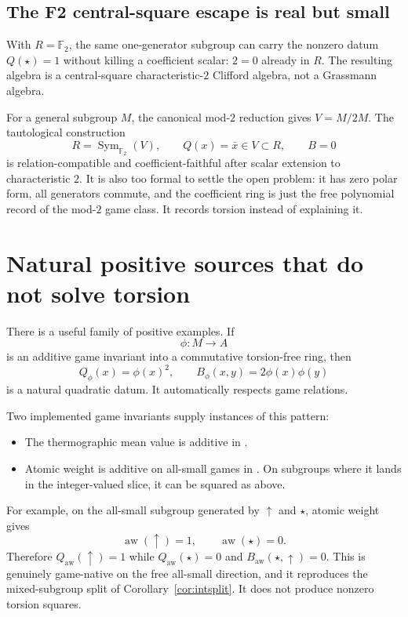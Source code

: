\documentclass[11pt]{article}
\theoremstyle{remark}
\newcommand{\F}{\mathbb{F}}
\newcommand{\Sym}{\operatorname{Sym}}
\newcommand{\aw}{\operatorname{aw}}
\begin{document}
\subsection{The F2 central-square escape is real but small}

With $R=\F_2$, the same one-generator subgroup can carry the nonzero datum
$Q(\star)=1$ without killing a coefficient scalar: $2=0$ already in $R$.
The resulting algebra is a central-square characteristic-$2$ Clifford algebra,
not a Grassmann algebra.

For a general subgroup $M$, the canonical mod-$2$ reduction gives
$V=M/2M$.  The tautological construction
\[
  R=\Sym_{\F_2}(V),\qquad Q(x)=\bar{x}\in V\subset R,\qquad B=0
\]
is relation-compatible and coefficient-faithful after scalar extension to
characteristic $2$.  It is also too formal to settle the open problem: it has
zero polar form, all generators commute, and the coefficient ring is just the
free polynomial record of the mod-$2$ game class.  It records torsion instead
of explaining it.

\section{Natural positive sources that do not solve torsion}

There is a useful family of positive examples.  If
\[
  \phi\colon M\to A
\]
is an additive game invariant into a commutative torsion-free ring, then
\[
  Q_\phi(x)=\phi(x)^2,\qquad
  B_\phi(x,y)=2\phi(x)\phi(y)
\]
is a natural quadratic datum.  It automatically respects game relations.

Two implemented game invariants supply instances of this pattern:

\begin{itemize}[leftmargin=2em]
\item The thermographic mean value is additive in
  .
\item Atomic weight is additive on all-small games in
  .  On subgroups where it lands in the
  integer-valued slice, it can be squared as above.
\end{itemize}

For example, on the all-small subgroup generated by $\uparrow$ and $\star$,
atomic weight gives
\[
  \aw(\uparrow)=1,\qquad \aw(\star)=0.
\]
Therefore $Q_{\aw}(\uparrow)=1$ while $Q_{\aw}(\star)=0$ and
$B_{\aw}(\star,\uparrow)=0$.  This is genuinely game-native on the free
all-small direction, and it reproduces the mixed-subgroup split of
Corollary~\ref{cor:intsplit}.  It does not produce nonzero torsion squares.
\end{document}
